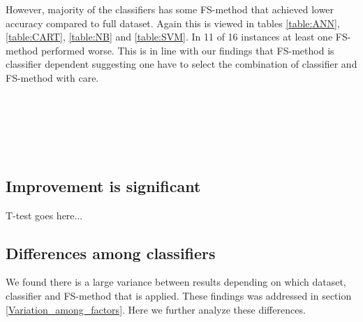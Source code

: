 However, majority of the classifiers has some FS-method that achieved lower accuracy compared to full dataset. Again this is viewed in tables \ref{table:ANN}, \ref{table:CART}, \ref{table:NB} and \ref{table:SVM}. In 11 of 16 instances at least one FS-method performed worse. This is in line with our findings that FS-method is classifier dependent suggesting one have to select the combination of classifier and FS-method with care.

\begin{table}[h]
  
  \caption[]%
  {{\small Classification accuracy achieved by ANN was improved on all datasets by the use of some feature selection method.}}
  \label{table:ANN}
\end{table}

\begin{table}[h]
   \\
  \caption[]%
  {{\small All datasets except MIAS benefited from feature selection using CART Decision Tree classifier.}}
  \label{table:CART}
\end{table}

\begin{table}[h]
   \\
  \caption[]%
  {{\small Na\"ive Bayes sees improvement or equivalent accuracy by feature selection on every dataset.}}
  \label{table:NB}
\end{table}

\begin{table}[h]
   \\
  \caption[]%
  {{\small Classification accuracy achieved by SVM was improved or equivalent on every dataset with use of feature selection.}}
  \label{table:SVM}
\end{table}

\subsection{Improvement is significant}

T-test goes here...

\subsection{Differences among classifiers}

We found there is a large variance between results depending on which dataset, classifier and FS-method that is applied. These findings was addressed in section \ref{Variation_among_factors}. Here we further analyze these differences.

